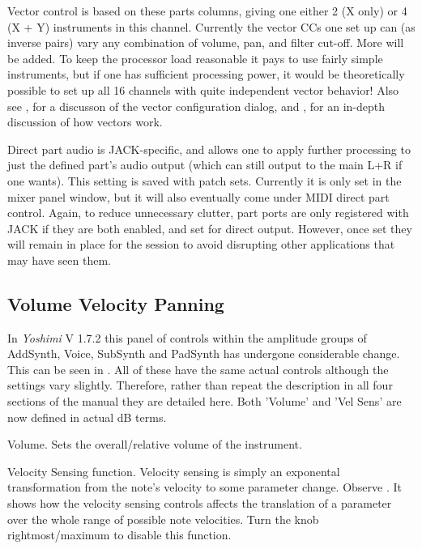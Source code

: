    Vector control is based on these parts columns, giving one either 2 (X
   only) or 4 (X + Y) instruments in this channel. Currently the vector
   CCs one set up can (as inverse pairs) vary any combination of volume, pan,
   and filter cut-off.  More will be added.  To keep the processor load
   reasonable it pays to use fairly simple instruments, but if one has
   sufficient processing power, it would be theoretically possible to set up
   all 16 channels with quite independent vector behavior!
   Also see
   , for a discusson of the vector
   configuration dialog, and , for an in-depth
   discussion of how vectors work.

   Direct part audio is JACK-specific, and allows one to apply further
   processing to just the defined part's audio output (which can still output
   to the main L+R if one wants). This setting is saved with patch sets.
   Currently it is only set in the mixer panel window, but it will also
   eventually come under MIDI direct part control.  Again, to reduce
   unnecessary clutter, part ports are only registered with JACK if they are
   both enabled, and set for direct output. However, once set they will remain
   in place for the session to avoid disrupting other applications that may
   have seen them.

\subsection{Volume Velocity Panning}
\label{subsec:volume_panning}
   In \textsl{Yoshimi} V 1.7.2 this panel of controls within the amplitude
   groups of AddSynth, Voice, SubSynth and PadSynth has undergone considerable
   change. This can be seen in . All of these
   have the same actual controls although the settings vary slightly.
   Therefore, rather than repeat the description in all four sections of the
   manual they are detailed here.
   Both 'Volume' and 'Vel Sens' are now defined in actual dB terms.

   \setcounter{ItemCounter}{0}
   Volume.
   Sets the overall/relative volume of the instrument.

   Velocity Sensing function.
   Velocity sensing is simply an exponental transformation from the note’s
   velocity to some parameter change.
   Observe .
   It shows how the velocity sensing controls affects the translation of a
   parameter over the whole range of possible note velocities.
   Turn the knob rightmost/maximum to disable this function.

